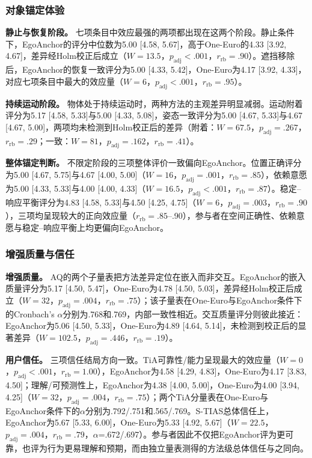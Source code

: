 \documentclass[review]{vgtc}
\begin{document}


\subsubsection{对象锚定体验}

\textbf{静止与恢复阶段。}
七项条目中效应最强的两项都出现在这两个阶段。静止条件下，EgoAnchor的评分中位数为5.00 [4.58, 5.67]，高于One-Euro的4.33 [3.92, 4.67]，差异经Holm校正后成立（$W=13.5$，$p_{\mathrm{adj}}<.001$，$r_{\mathrm{rb}}=.90$）。遮挡移除后，EgoAnchor的恢复一致评分为5.00 [4.33, 5.42]，One-Euro为4.17 [3.92, 4.33]，对应七项条目中最大的效应量（$W=6$，$p_{\mathrm{adj}}<.001$，$r_{\mathrm{rb}}=.95$）。

\textbf{持续运动阶段。}
物体处于持续运动时，两种方法的主观差异明显减弱。运动附着评分为5.17 [4.58, 5.33]与5.00 [4.33, 5.08]，姿态一致评分为5.00 [4.67, 5.33]与4.67 [4.67, 5.00]，两项均未检测到Holm校正后的差异（附着：$W=67.5$，$p_{\mathrm{adj}}=.267$，$r_{\mathrm{rb}}=.29$；一致：$W=81$，$p_{\mathrm{adj}}=.162$，$r_{\mathrm{rb}}=.41$）。

\textbf{整体锚定判断。}
不限定阶段的三项整体评价一致偏向EgoAnchor。位置正确评分为5.00 [4.67, 5.75]与4.67 [4.00, 5.00]（$W=16$，$p_{\mathrm{adj}}=.001$，$r_{\mathrm{rb}}=.85$），依赖意愿为5.00 [4.33, 5.33]与4.00 [4.00, 4.33]（$W=16.5$，$p_{\mathrm{adj}}<.001$，$r_{\mathrm{rb}}=.87$）。稳定--响应平衡评分为4.83 [4.58, 5.33]与4.50 [4.25, 4.75]（$W=6$，$p_{\mathrm{adj}}=.003$，$r_{\mathrm{rb}}=.90$），三项均呈现较大的正向效应量（$r_{\mathrm{rb}}=.85$--.90），参与者在空间正确性、依赖意愿与稳定--响应平衡上均更偏向EgoAnchor。

\subsubsection{增强质量与信任}

\textbf{增强质量。}
AQ的两个子量表把方法差异定位在嵌入而非交互。EgoAnchor的嵌入质量评分为5.17 [4.50, 5.47]，One-Euro为4.78 [4.50, 5.03]，差异经Holm校正后成立（$W=32$，$p_{\mathrm{adj}}=.004$，$r_{\mathrm{rb}}=.75$）；该子量表在One-Euro与EgoAnchor条件下的Cronbach's $\alpha$分别为.768和.769，内部一致性相近。交互质量评分则彼此接近：EgoAnchor为5.06 [4.50, 5.33]，One-Euro为4.89 [4.64, 5.14]，未检测到校正后的显著差异（$W=102.5$，$p_{\mathrm{adj}}=.446$，$r_{\mathrm{rb}}=.19$）。

\textbf{用户信任。}
三项信任结局方向一致。TiA可靠性/能力呈现最大的效应量（$W=0$，$p_{\mathrm{adj}}<.001$，$r_{\mathrm{rb}}=1.00$），EgoAnchor为4.58 [4.29, 4.83]，One-Euro为4.17 [3.83, 4.50]；理解/可预测性上，EgoAnchor为4.38 [4.00, 5.00]，One-Euro为4.00 [3.94, 4.25]（$W=32$，$p_{\mathrm{adj}}=.004$，$r_{\mathrm{rb}}=.75$）；两个TiA分量表在One-Euro与EgoAnchor条件下的$\alpha$分别为.792/.751和.565/.769。S-TIAS总体信任上，EgoAnchor为5.67 [5.33, 6.00]，One-Euro为5.33 [4.92, 5.67]（$W=22.5$，$p_{\mathrm{adj}}=.004$，$r_{\mathrm{rb}}=.79$，$\alpha$=.672/.697）。参与者因此不仅把EgoAnchor评为更可靠，也评为行为更易理解和预期，而由独立量表测得的方法级总体信任与之同向。
\end{document}
